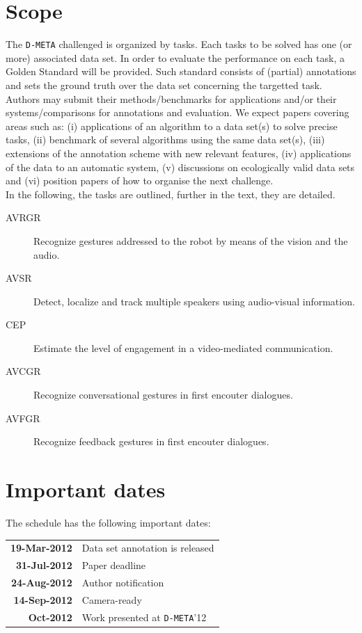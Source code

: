 \documentclass[a4paper]{article}
\begin{document}
\section*{Scope}
The \texttt{D-META} challenged is organized by tasks. Each tasks to be solved has one (or more) associated data set. In
order to evaluate the performance on each task, a Golden Standard will be provided. Such standard consists of (partial)
annotations and sets the ground truth over the data set concerning the targetted task.\vspace{0.2cm}\\
Authors may submit their methods/benchmarks for applications and/or their systems/comparisons for
annotations and evaluation. We expect papers covering areas such as: (i) applications of an algorithm to a data
set(s) to solve precise tasks, (ii) benchmark of several algorithms using the same data set(s), (iii) extensions of the
annotation scheme with new relevant features, (iv) applications of the data to an automatic system, (v) discussions on
ecologically valid data sets and (vi) position papers of how to organise the next challenge.\vspace{0.2cm}\\
In the following, the tasks are outlined, further in the text, they are detailed.
\begin{description}
 \item [AVRGR] Recognize gestures addressed to the robot by means of the vision and the audio.
 \item [AVSR] Detect, localize and track multiple speakers using audio-visual information.
 \item [CEP] Estimate the level of engagement in a video-mediated communication.
 \item [AVCGR] Recognize conversational gestures in first encouter dialogues.
 \item [AVFGR] Recognize feedback gestures in first encouter dialogues.
\end{description}

\section*{Important dates}
The schedule has the following important dates:
\begin{center}
\begin{tabular}{rl}
 \textbf{19-Mar-2012} & Data set annotation is released \vspace{0.1cm}\\
 \textbf{31-Jul-2012} & Paper deadline \vspace{0.1cm}\\
 \textbf{24-Aug-2012} & Author notification \vspace{0.1cm}\\
 \textbf{14-Sep-2012} & Camera-ready \vspace{0.1cm}\\
    \textbf{Oct-2012} & Work presented at \texttt{D-META}'12 \vspace{0.1cm}\\
\end{tabular}
\end{center}
\end{document}

